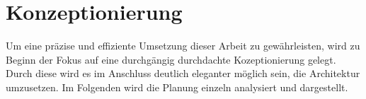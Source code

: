 \chapter{Konzeptionierung}


Um eine präzise und effiziente Umsetzung dieser Arbeit zu gewährleisten, wird zu Beginn der Fokus auf eine durchgängig durchdachte Kozeptionierung gelegt. Durch diese wird es im Anschluss deutlich eleganter möglich sein, die Architektur umzusetzen. Im Folgenden wird die Planung einzeln analysiert und dargestellt.






